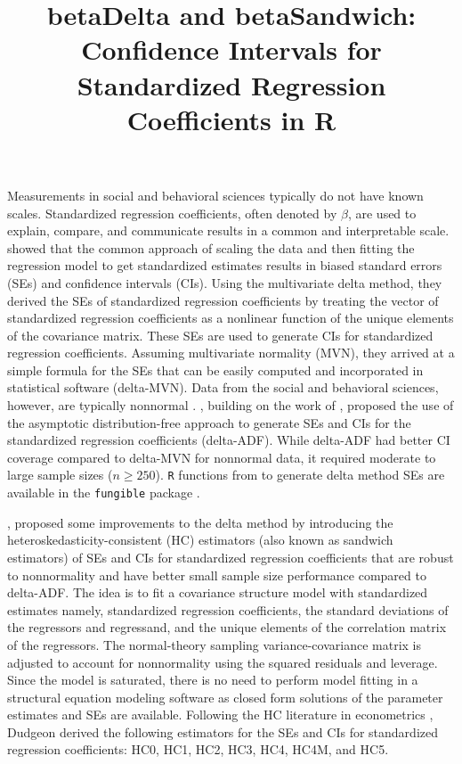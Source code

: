\documentclass[man]{apa7}\usepackage[]{graphicx}\usepackage[]{xcolor}
\title{betaDelta and betaSandwich: Confidence Intervals for Standardized Regression Coefficients in R}
\begin{document}
\maketitle
Measurements in social and behavioral sciences typically do not have known scales. Standardized regression coefficients, often denoted by $\beta$, are used to explain, compare, and communicate results in a common and interpretable scale. \Textcite{Lib-Regression-Standardized-Coefficients-Delta-Yuan-2011} showed that the common approach of scaling the data and then fitting the regression model to get standardized estimates results in biased standard errors (SEs) and confidence intervals (CIs). Using the multivariate delta method, they derived the SEs of standardized regression coefficients by treating the vector of standardized regression coefficients as a nonlinear function of the unique elements of the covariance matrix. These SEs are used to generate CIs for standardized regression coefficients. Assuming multivariate normality (MVN), they arrived at a simple formula for the SEs that can be easily computed and incorporated in statistical software (delta-MVN). Data from the social and behavioral sciences, however, are typically nonnormal \parencite{Lib-Nonnormality-Micceri-1989}. \Textcite{Lib-Regression-Standardized-Coefficients-Delta-Jones-2015}, building on the work of \Textcite{Lib-Regression-Standardized-Coefficients-Delta-Yuan-2011}, proposed the use of the asymptotic distribution-free \parencite[ADF:][]{Lib-Structural-Equation-Modeling-ADF-Browne-1984} approach to generate SEs and CIs for the standardized regression coefficients (delta-ADF). While delta-ADF had better CI coverage compared to delta-MVN for nonnormal data, it required moderate to large sample sizes ($n \geq 250$). \texttt{R} functions from \Textcite{Lib-Regression-Standardized-Coefficients-Delta-Jones-2015} to generate delta method SEs are available in the \texttt{fungible} package \parencite{Lib-R-Packages-fungible-2022}.

\Textcite{Lib-Regression-Standardized-Coefficients-HC-Dudgeon-2017}, proposed some improvements to the delta method by introducing the heteroskedasticity-consistent (HC) estimators (also known as sandwich estimators) of SEs and CIs for standardized regression coefficients that are robust to nonnormality and have better small sample size performance compared to delta-ADF. The idea is to fit a covariance structure model with standardized estimates namely, standardized regression coefficients, the standard deviations of the regressors and regressand, and the unique elements of the correlation matrix of the regressors. The normal-theory sampling variance-covariance matrix is adjusted to account for nonnormality using the squared residuals and leverage. Since the model is saturated, there is no need to perform model fitting in a structural equation modeling software as closed form solutions of the parameter estimates and SEs are available. Following the HC literature in econometrics \parencite[e.g.,][]{Lib-Regression-Heteroskedasticity-Consistent-Standard-Errors-White-1980, Lib-Regression-Heteroskedasticity-Consistent-Standard-Errors-Cribari-Neto-2007}, Dudgeon derived the following estimators for the SEs and CIs for standardized regression coefficients: HC0, HC1, HC2, HC3, HC4, HC4M, and HC5.
\end{document}
